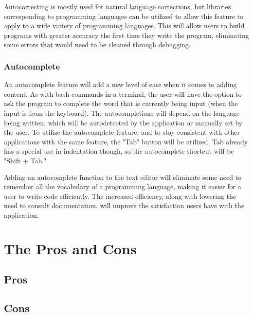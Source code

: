 \documentclass[11pt, oneside]{article}
\begin{document}
Autocorrecting is mostly used for natural language corrections, but libraries corresponding to programming languages can be utilized to allow this feature to apply to a wide variety of programming languages. This will allow users to build programs with greater accuracy the first time they write the program, eliminating some errors that would need to be cleaned through debugging. 

\subsubsection{Autocomplete}
An autocomplete feature will add a new level of ease when it comes to adding content. As with bash commands in a terminal, the user will have the option to ask the program to complete the word that is currently being input (when the input is from the keyboard). The autocompletions will depend on the language being written, which will be autodetected by the application or manually set by the user. To utilize the autocomplete feature, and to stay consistent with other applications with the same feature, the "Tab" button will be utilized. Tab already has a special use in indentation though, so the autocomplete shortcut will be "Shift + Tab."

Adding an autocomplete function to the text editor will eliminate some need to remember all the vocabulary of a programming language, making it easier for a user to write code efficiently. The increased efficiency, along with lowering the need to consult documentation, will improve the satisfaction users have with the application. 


\section{The Pros and Cons}
\subsection{Pros}


\subsection{Cons}
\end{document}
